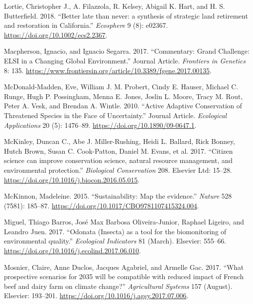 \documentclass[fleqn,10pt]{wlpeerj} %
\begin{document}
\leavevmode\hypertarget{ref-Lortie2018}{}%
Lortie, Christopher J., A. Filazzola, R. Kelsey, Abigail K. Hart, and H.
S. Butterfield. 2018. ``Better late than never: a synthesis of strategic
land retirement and restoration in California.'' \emph{Ecosphere} 9 (8):
e02367. \url{https://doi.org/10.1002/ecs2.2367}.

\leavevmode\hypertarget{ref-Macpherson2017}{}%
Macpherson, Ignacio, and Ignacio Segarra. 2017. ``Commentary: Grand
Challenge: ELSI in a Changing Global Environment.'' Journal Article.
\emph{Frontiers in Genetics} 8: 135.
\url{https://www.frontiersin.org/article/10.3389/fgene.2017.00135}.

\leavevmode\hypertarget{ref-McDonald2010}{}%
McDonald-Madden, Eve, William J. M. Probert, Cindy E. Hauser, Michael C.
Runge, Hugh P. Possingham, Menna E. Jones, Joslin L. Moore, Tracy M.
Rout, Peter A. Vesk, and Brendan A. Wintle. 2010. ``Active Adaptive
Conservation of Threatened Species in the Face of Uncertainty.'' Journal
Article. \emph{Ecological Applications} 20 (5): 1476--89.
\url{https://doi.org/10.1890/09-0647.1}.

\leavevmode\hypertarget{ref-McKinley2017}{}%
McKinley, Duncan C., Abe J. Miller-Rushing, Heidi L. Ballard, Rick
Bonney, Hutch Brown, Susan C. Cook-Patton, Daniel M. Evans, et al. 2017.
``Citizen science can improve conservation science, natural resource
management, and environmental protection.'' \emph{Biological
Conservation} 208. Elsevier Ltd: 15--28.
\url{https://doi.org/10.1016/j.biocon.2016.05.015}.

\leavevmode\hypertarget{ref-McKinnon2015}{}%
McKinnon, Madeleine. 2015. ``Sustainability: Map the evidence.''
\emph{Nature} 528 (7581): 185--87.
\url{https://doi.org/10.1017/CBO9781107415324.004}.

\leavevmode\hypertarget{ref-Miguel2017}{}%
Miguel, Thiago Barros, José Max Barbosa Oliveira-Junior, Raphael
Ligeiro, and Leandro Juen. 2017. ``Odonata (Insecta) as a tool for the
biomonitoring of environmental quality.'' \emph{Ecological Indicators}
81 (March). Elsevier: 555--66.
\url{https://doi.org/10.1016/j.ecolind.2017.06.010}.

\leavevmode\hypertarget{ref-Mosnier2017}{}%
Mosnier, Claire, Anne Duclos, Jacques Agabriel, and Armelle Gac. 2017.
``What prospective scenarios for 2035 will be compatible with reduced
impact of French beef and dairy farm on climate change?''
\emph{Agricultural Systems} 157 (August). Elsevier: 193--201.
\url{https://doi.org/10.1016/j.agsy.2017.07.006}.
\end{document}
